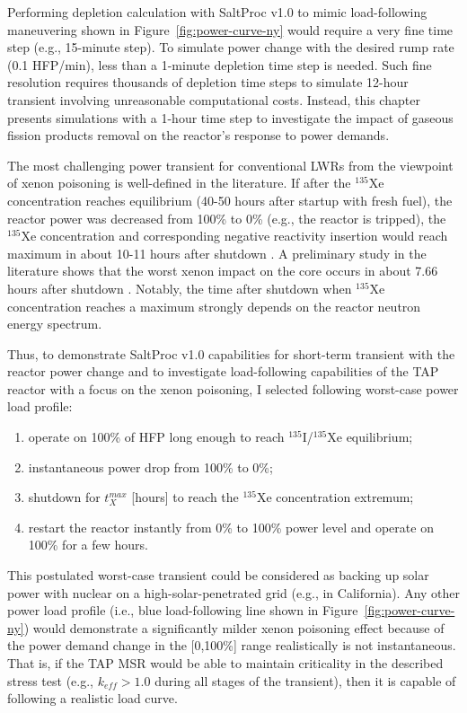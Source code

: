 Performing depletion calculation with SaltProc v1.0 to mimic load-following 
maneuvering shown in Figure~\ref{fig:power-curve-ny} would require a very fine 
time step (e.g., 15-minute step). To simulate power change with the desired 
rump rate (0.1 \gls{HFP}/min), less than a 1-minute depletion time step is 
needed. 
Such fine resolution requires thousands of depletion time steps to simulate 
12-hour transient involving unreasonable computational costs. 
Instead, this chapter presents simulations with a 1-hour time step to 
investigate the impact of gaseous fission products removal on the reactor's 
response to power demands. 

The most challenging power transient for conventional \glspl{LWR} from the 
viewpoint of xenon poisoning is well-defined in the literature. If after the 
$^{135}$Xe concentration reaches equilibrium (40-50 hours after startup with 
fresh fuel), the reactor power was decreased from 100\% to 0\% (e.g., the 
reactor is tripped), the $^{135}$Xe concentration and corresponding negative 
reactivity insertion would reach maximum in about 10-11 hours after shutdown 
\cite{lamarsh_introduction_1975, 
bell_nuclear_1970}. A preliminary study in the literature shows that the worst 
xenon impact on the core occurs in about 7.66 
hours after shutdown \cite{rykhlevskii_impact_2019}. Notably, the time after 
shutdown when $^{135}$Xe concentration reaches a maximum strongly depends on 
the reactor neutron energy spectrum.

Thus, to demonstrate SaltProc v1.0 capabilities for short-term transient with 
the reactor power change and to investigate load-following capabilities of the 
\gls{TAP} reactor with a focus on the xenon poisoning, I selected following 
worst-case power load profile:
\begin{enumerate}[label=(\alph*), noitemsep, topsep=0pt]
	\item operate on 100\% of \gls{HFP} long enough to reach 
	$^{135}$I/$^{135}$Xe equilibrium;
	\item instantaneous power drop from 100\% to 0\%;
	\item shutdown for $t^{max}_X$ [hours] to reach the $^{135}$Xe 
	concentration extremum;
	\item restart the reactor instantly from 0\% to 100\% power level and 
	operate on 100\% for a few hours.
\end{enumerate}
This postulated worst-case transient could be considered as backing up solar 
power with 
nuclear on a high-solar-penetrated grid (e.g., in California).
Any other power load profile (i.e., blue load-following line shown in  
Figure~\ref{fig:power-curve-ny}) would demonstrate a significantly milder 
xenon poisoning effect because of the power demand change in the [0,100\%] 
range realistically is not instantaneous. That is, if the \gls{TAP} \gls{MSR} 
would be able to maintain criticality in the described stress test (e.g., 
$k_{eff}>1.0$ during all stages of the transient), then it is capable of 
following a realistic load curve.

